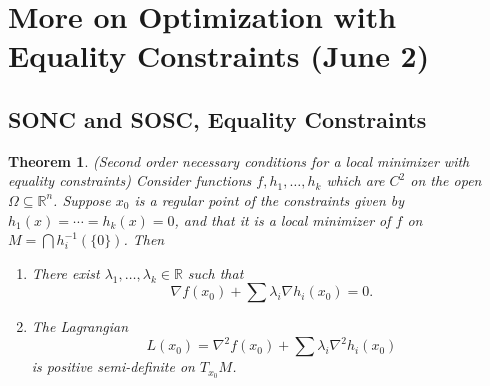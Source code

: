 \documentclass[11pt]{book}
\newcommand{\R}{\mathbb{R}}
\newtheorem{theorem}{Theorem}[subsection]
\begin{document}
\newpage

\section{More on Optimization with Equality Constraints (June 2)}

\subsection{SONC and SOSC, Equality Constraints}

\begin{theorem}
(Second order necessary conditions for a local minimizer with equality constraints) Consider functions $f, h_1, \dots, h_k$ which are $C^2$ on the open $\Omega \subseteq \R^n$. Suppose $x_0$ is a regular point of the constraints given by $h_1(x) = \cdots = h_k(x) = 0$, and that it is a local minimizer of $f$ on $M = \bigcap h_i^{-1}(\{0\})$. Then
\begin{enumerate}
\item
There exist $\lambda_1, \dots, \lambda_k \in \R$ such that
\[
\nabla f(x_0) + \sum \lambda_i \nabla h_i(x_0) = 0.
\]

\item
The Lagrangian
\[
L(x_0) = \nabla^2 f(x_0) + \sum \lambda_i \nabla^2 h_i(x_0)
\]
is positive semi-definite on $T_{x_0}M$.
\end{enumerate}
\end{theorem}
\end{document}
